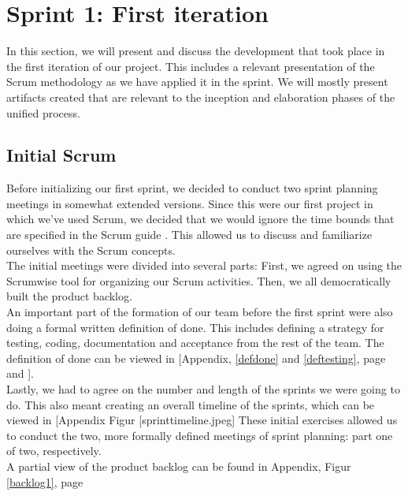 \section{Sprint 1: First iteration}
In this section, we will present and discuss the development that took place in the first iteration of our project. This includes a relevant presentation of the Scrum methodology as we have applied it in the sprint. We will mostly present artifacts created that are relevant to the inception and elaboration phases of the unified process.
\subsection{Initial Scrum}
Before initializing our first sprint, we decided to conduct two sprint planning meetings in somewhat extended versions. Since this were our first project in which we’ve used Scrum, we decided that we would ignore the time bounds that are specified in the Scrum guide \cite[p.~9]{scrumguide}. This allowed us to discuss and familiarize ourselves with the Scrum concepts.\\
The initial meetings were divided into several parts: First, we agreed on using the Scrumwise \cite{scrumwise} tool for organizing our Scrum activities. Then, we all democratically built the product backlog. \\
An important part of the formation of our team before the first sprint were also doing a formal written definition of done. This includes defining a strategy for testing, coding, documentation and acceptance from the rest of the team. The definition of done can be viewed in [Appendix, \ref{defdone} and \ref{deftesting}, page \pageref{defdone} and \pageref{deftesting}].\\
Lastly, we had to agree on the number and length of the sprints we were going to do. This also meant creating an overall timeline of the sprints, which can be viewed in [Appendix Figur [sprinttimeline.jpeg]  These initial exercises allowed us to conduct the two, more formally defined meetings of sprint planning: part one of two, respectively. \\
A partial view of the product backlog can be found in Appendix, Figur \ref{backlog1}, page \pageref{backlog1} \\
